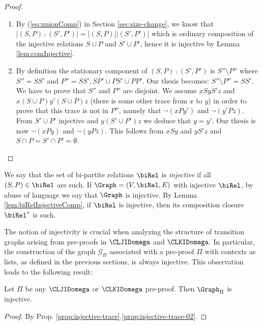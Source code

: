 \begin{proof}
\begin{enumerate}
\item
By (\ref{eq:unionComp}) in Section \ref{sec:size-change},  we know that $|(S,P) \comp (S',P')| =  |(S,P)| |(S',P')|$ which is ordinary composition of the injective relations $S \cup P$ and $S' \cup P'$, hence it is injective by Lemma \ref{lem:comInjective}.

\item
By definition the stationary component of $(S,P) \comp (S',P')$ is $S'' \setminus P''$
where $S'' =S S'$ and $P'' = SS', SP' \cup PS' \cup PP'$. Our thesis becomes:
$S'' \setminus P'' = S S'$. We have to prove that $S''$ and $P''$ are disjoint. 
We assume $xSyS'z$ and $x (S \cup P) y' (S \cup P) z$ 
(there is some other trace from $x$ to $y$) 
in order to prove that this trace is not in $P''$, namely that
$\neg (x P  y')$ and $\neg (y' P  z)$.  From $S' \cup P'$ injective and $y (S' \cup P') z$
we deduce that $y = y'$. Our thesis is now $\neg (x P  y)$ and $\neg (y P  z)$.
This follows from $xSy$ and $yS'z$ and $S \cap P = S' \cap P' = \emptyset$.
\end{enumerate}
\end{proof}


We say that the set of bi-partite relations $\biRel$ is {\em injective} if all $(S,P) \in \biRel$ are such. If $\Graph = (V, \biRel, E)$ with injective $\biRel$, by abuse of language we say that $\Graph$ is injective. By Lemma \ref{lem:biRelInjectiveComp}, if $\biRel$ is injective, then its composition closure $\biRel^*$ is such. 

The notion of injectivity is crucial when analyzing the structure of transition graphs arising from pre-proofs in $\CLJIDomega$ and $\CLKIDomega$. In particular, the construction of the graph $\mathcal{G}_{\Pi}$ associated with a pre-proof $\Pi$ with contexts as lists, as defined in the previous sections, is always injective. 
This observation leads to the following result:

\begin{theorem}\label{thr:injective-pre-proofs}
Let $\Pi$ be any $\CLJIDomega$ or $\CLKIDomega$ pre-proof. 
Then $\Graph_\Pi$ is injective.
\end{theorem}

\begin{proof}
By Prop. \ref{prop:injective-trace}.\ref{prop:injective-trace-02}.
\end{proof}

